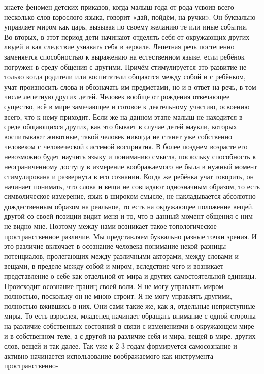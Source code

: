 знаете феномен детских приказов, когда малыш года от рода усвоив всего несколько
слов взрослого языка, говорит «дай, пойдём, на ручки». Он буквально управляет
миром как царь, вызывая по своему желанию те или иные события. Во-вторых, в этот
период дети начинают отделять себя от окружающих других людей и как следствие
узнавать себя в зеркале. Лепетная речь постепенно заменяется способностью к
выражению на естественном языке, если ребёнок погружен в среду общения с
другими. Причём стимулируется это развитие не только когда родители или
воспитатели общаются между собой и с ребёнком, учат произносить слова и
обозначать им предметами, но и в ответ на речь, в том числе лепетную других
детей. Человек вообще от рождения отвечающее существо, всё в мире замечающее и
готовое к деятельному участию, освоению всего, что к нему приходит. Если же на
данном этапе малыш не находится в среде общающихся других, как это бывает в
случае детей маукли, которых воспитывают животные, такой человек никогда не
станет уже собственно человеком с человеческой системой восприятия. В более
позднем возрасте его невозможно будет научить языку и пониманию смысла,
поскольку способность к неограниченному доступу в измерение воображаемого не
была в нужный момент стимулирована и развернута в его сознании. Когда же ребёнка
учат говорить, он начинает понимать, что слова и вещи не совпадают однозначным
образом, то есть символическое измерение, язык в широком смысле, не
накладывается абсолютно дождественным образом на реальное, то есть на окружающее
положение вещей. другой со своей позиции видит меня и то, что в данный момент
общения с ним не видно мне. Поэтому между нами возникает такое топологическое
пространственное различие. Мы представляем буквально разные точки зрения. И это
различие включает в осознание человека понимание некой разницы потенциалов,
пролегающих между различными акторами, между словами и вещами, в пределе между
собой и миром, вследствие чего и возникает представление о себе как отдельной от
мира и других самостоятельной единицы. Происходит осознание границ своей воли. Я
не могу управлять миром полностью, поскольку он не мною строит. Я не могу
управлять другими, полностью вжившись в них. Они сами такие же, как я, отдельные
неприступные миры. То есть взрослея, младенец начинает обращать внимание с одной
стороны на различие собственных состояний в связи с изменениями в окружающем
мире и в собственном теле, а с другой на различие себя и мира, вещей в мире,
других слов, вещей и так далее. Так уже к 2-3 годам формируется самосознание и
активно начинается использование воображаемого как инструмента пространственно-
